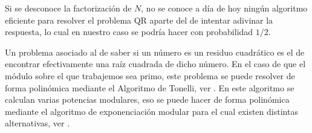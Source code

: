 Si se desconoce la factorización de $N$, no se conoce a día de hoy ningún
algoritmo eficiente para resolver el problema QR aparte del de intentar
adivinar la respuesta, lo cual en nuestro caso se podr\'ia hacer con
probabilidad $1/2$.


%

Un problema asociado al de saber si un n\'umero es un residuo cuadr\'atico es el de encontrar efectivamente una ra\'iz cuadrada de dicho n\'umero.
En el caso de que el m\'odulo sobre el que trabajemos sea primo, este problema se puede resolver de forma polin\'omica mediante el Algoritmo de Tonelli, ver \cite[Proposition 2.16]{Pardo}.
En este algoritmo se calculan varias potencias modulares, eso se puede hacer de forma
polin\'omica mediante el algoritmo de exponenciaci\'on modular para el cual existen
distintas alternativas, ver \cite[Section 2.7.2]{Pardo}.

